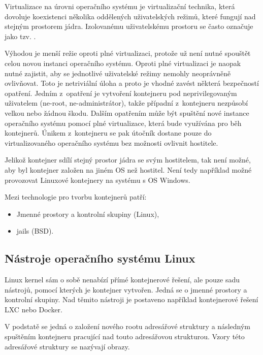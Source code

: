 
Virtualizace na úrovni operačního systému je virtualizační technika, která dovoluje koexistenci několika oddělených uživatelských režimů, které fungují nad stejným prostorem jádra.
Izolovanému uživatelskému prostoru se často označuje jako tzv. .

Výhodou je menší režie oproti plné virtualizaci, protože už není nutné spouštět celou novou instanci operačního systému.
Oproti plné virtualizaci je naopak nutné zajistit, aby se jednotlivé uživatelské režimy nemohly neoprávněně ovlivňovat.
Toto je netriviální úloha a proto je vhodné zavést některá bezpečností opatření.
Jedním z~opatření je vytvoření kontejneru pod neprivilegovaným uživatelem (ne-root, ne-administrátor), takže případní  z~kontejneru nezpůsobí velkou nebo žádnou škodu.
Dalším opatřením může být spuštění nové instance operačního systému pomocí plné virtualizace, která bude využívána pro běh kontejnerů.
Únikem z~kontejneru se pak útočník dostane pouze do virtualizovaného operačního systému bez možnosti ovlivnit hostitele.

Jelikož kontejner sdílí stejný prostor jádra se svým hostitelem, tak není možné, aby byl kontejner založen na jiném OS než hostitel.
Není tedy například možné provozovat Linuxové kontejnery na systému s OS Windows.

Mezi technologie pro tvorbu kontejnerů patří:

\begin{itemize}
	\item Jmenné prostory a kontrolní skupiny (Linux),
	\item jails (BSD).
\end{itemize}

\subsection{Nástroje operačního systému Linux}

Linux kernel sám o sobě nenabízí přímé kontejnerové řešení, ale pouze sadu nástrojů, pomocí kterých je kontejner vytvořen.
Jedná se o jmenné prostory a kontrolní skupiny.
Nad těmito nástroji je postaveno například kontejnerové řešení LXC nebo Docker.

V podstatě se jedná o založení nového rootu adresářové struktury a následným spuštěním kontejneru pracující nad touto adresářovou strukturou.
Vzory této adresářové struktury se nazývají obrazy.

